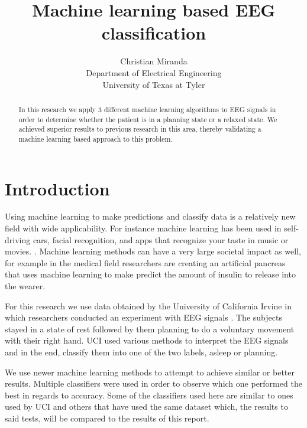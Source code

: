 \documentclass[conference,compsoc]{IEEEtran}
\begin{document}
\author{Christian Miranda\\Department of Electrical Engineering\\University of Texas at Tyler}
\title{Machine learning based EEG classification}
\maketitle

\begin{abstract}
In this research we apply 3 different machine learning algorithms to EEG signals in order to determine whether the patient is in a planning state or a relaxed state.  We achieved superior results to previous research in this area, thereby validating a machine learning based approach to this problem.
\end{abstract}

\section{Introduction}
Using machine learning to make predictions and classify data is a relatively new field with wide applicability.  For instance machine learning has been used in self-driving cars, facial recognition, and apps that recognize your taste in music or movies. .  Machine learning methods can have a very large societal impact as well, for example in the medical field researchers are creating an artificial pancreas that uses machine learning \cite{diabetes} to make predict the amount of insulin to release into the wearer.

For this research we use data obtained by the University of California Irvine in which researchers conducted an experiment with EEG signals \cite{classsvm}.  The subjects stayed in a state of rest followed by them planning to do a voluntary movement with their right hand. UCI  used various methods to interpret the EEG signals and in the end, classify them into one of the two labels, asleep or planning. 

We use newer machine learning methods to attempt to achieve similar or better results. Multiple classifiers were used in order to observe which one performed the best in regards to accuracy. Some of the classifiers used here are similar to ones used by UCI and others that have used the same dataset \cite{fuzzy} which, the results to said tests, will be compared to the results of this report.
\end{document}
